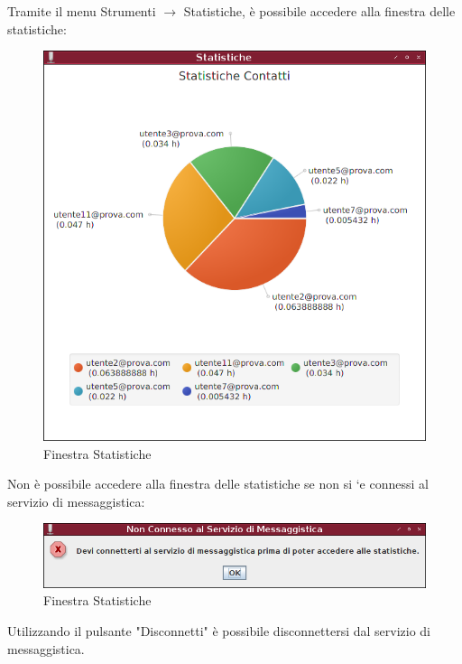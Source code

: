 \documentclass[a4paper, 11pt]{article} %
\begin{document}
\clearpage
\hspace{-0.6cm}
Tramite il menu Strumenti $\rightarrow$ Statistiche, \`e possibile accedere alla finestra delle statistiche:
\begin{figure}[H]
\includegraphics[width=1.0\textwidth]{images/client-12.png}
\vspace{-0.6cm}
\caption{Finestra Statistiche}
\end{figure}
Non \`e possibile accedere alla finestra delle statistiche se non si `e connessi al servizio di messaggistica:
\begin{figure}[H]
\includegraphics[width=1.0\textwidth]{images/client-17.png}
\vspace{-0.6cm}
\caption{Finestra Statistiche}
\end{figure}
\clearpage
Utilizzando il pulsante "Disconnetti" \`e possibile disconnettersi dal servizio di messaggistica.
\end{document}
